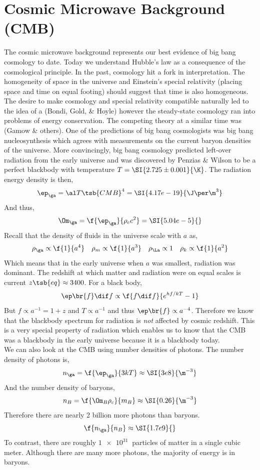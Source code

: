 \documentclass{article}
\begin{document}
\section{Cosmic Microwave Background (CMB)}
The cosmic microwave background represents our best evidence of big bang cosmology to date. Today we understand Hubble's law as a consequence of the cosmological principle. In the past, cosmology hit a fork in interpretation. The homogeneity of space in the universe and Einstein's special relativity (placing space and time on equal footing) should suggest that time is also homogeneous. The desire to make cosmology and special relativity compatible naturally led to the idea of a  (Bondi, Gold, \& Hoyle) however the steady-state cosmology ran into problems of energy conservation. The competing theory at a similar time was  (Gamow \& others). One of the predictions of big bang cosmologists was big bang nucleosynthesis which agrees with measurements on the current baryon densities of the universe. More convincingly, big bang cosmology predicted left-over radiation from the early universe and was discovered by Penzias \& Wilson to be a perfect blackbody with temperature $T = \SI{2.725\pm0.001}{\K}$. The radiation energy density is then,
\[ \ep_{\ga} = \al T\tsb{CMB}^4 = \SI{4.17e-19}{\J\per\m^3} \]
And thus,
\[ \Om_{\ga} = \f{\ep_\ga}{\rho_c c^2} = \SI{5.04e-5}{} \]
Recall that the density of fluids in the universe scale with $a$ as,
\[ \rho_{\ga} \propto \f{1}{a^4} \quad \rho_{m} \propto \f{1}{a^3} \quad\rho_{\La} \propto 1 \quad\rho_{k} \propto \f{1}{a^2} \]
Which means that in the early universe when $a$ was smallest, radiation was dominant. The redshift at which matter and radiation were on equal scales is current $z\tsb{eq} \approx 3400$. For a black body,
\[ \ep\br{f} \dif f \propto \f{f \dif f}{e^{hf /k T} - 1} \]
But $f \propto a^{-1} = 1 + z$ and $T \propto a^{-1}$ and thus $\ep\br{f} \propto a^{-4}$. Therefore we know that the blackbody spectrum for radiation is \textit{not} affected by cosmic redshift. This is a very special property of radiation which enables us to know that the CMB was a blackbody in the early universe because it is a blackbody today.\\

We can also look at the CMB using number densities of photons. The number density of photons is,
\[ n_\ga = \f{\ep_\ga}{3 k T} \approx \SI{3e8}{\m^{-3}} \]
And the number density of baryons,
\[ n_B = \f{\Om_B \rho_c}{m_B} \approx \SI{0.26}{\m^{-3}} \]
Therefore there are nearly 2 billion more photons than baryons.
\[ \f{n_\ga}{n_B} \approx \SI{1.7e9}{} \]
To contrast, there are roughly $\SI{1e31}{}$ particles of matter in a single cubic meter. Although there are many more photons, the majority of energy is in baryons. \\
\end{document}
